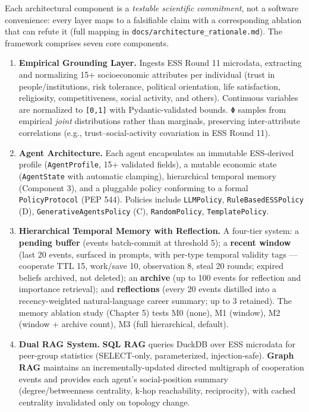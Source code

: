
Each architectural component is a \textit{testable scientific commitment}, not a software convenience: every layer maps to a falsifiable claim with a corresponding ablation that can refute it (full mapping in \texttt{docs/architecture\_rationale.md}). The framework comprises seven core components.

\begin{enumerate}
\item \textbf{Empirical Grounding Layer.} Ingests ESS Round 11 microdata, extracting and normalizing 15+ socioeconomic attributes per individual (trust in people/institutions, risk tolerance, political orientation, life satisfaction, religiosity, competitiveness, social activity, and others). Continuous variables are normalized to \texttt{[0,1]} with Pydantic-validated bounds. \texttt{Φ} samples from empirical \textit{joint} distributions rather than marginals, preserving inter-attribute correlations (e.g., trust–social-activity covariation in ESS Round 11).
\item \textbf{Agent Architecture.} Each agent encapsulates an immutable ESS-derived profile (\texttt{AgentProfile}, 15+ validated fields), a mutable economic state (\texttt{AgentState} with automatic clamping), hierarchical temporal memory (Component 3), and a pluggable policy conforming to a formal \texttt{PolicyProtocol} (PEP 544). Policies include \texttt{LLMPolicy}, \texttt{RuleBasedESSPolicy} (D), \texttt{GenerativeAgentsPolicy} (C), \texttt{RandomPolicy}, \texttt{TemplatePolicy}.
\item \textbf{Hierarchical Temporal Memory with Reflection.} A four-tier system: a \textbf{pending buffer} (events batch-commit at threshold 5); a \textbf{recent window} (last 20 events, surfaced in prompts, with per-type temporal validity tags — cooperate TTL 15, work/save 10, observation 8, steal 20 rounds; expired beliefs archived, not deleted); an \textbf{archive} (up to 100 events for reflection and importance retrieval); and \textbf{reflections} (every 20 events distilled into a recency-weighted natural-language career summary; up to 3 retained). The memory ablation study (Chapter 5) tests M0 (none), M1 (window), M2 (window + archive count), M3 (full hierarchical, default).
\item \textbf{Dual RAG System.} \textbf{SQL RAG} queries DuckDB over ESS microdata for peer-group statistics (SELECT-only, parameterized, injection-safe). \textbf{Graph RAG} maintains an incrementally-updated directed multigraph of cooperation events and provides each agent's social-position summary (degree/betweenness centrality, k-hop reachability, reciprocity), with cached centrality invalidated only on topology change.

\end{enumerate}
